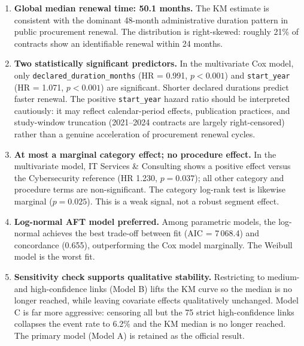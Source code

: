 \documentclass[12pt, a4paper]{article}
\begin{document}
\begin{enumerate}[leftmargin=*, label=\textbf{F\arabic*.}]

  \item \textbf{Global median renewal time: 50.1 months.} The KM estimate
        is consistent with the dominant 48-month administrative duration
        pattern in public procurement renewal. The distribution is right-skewed:
        roughly 21\% of contracts show an identifiable renewal within 24 months.

  \item \textbf{Two statistically significant predictors.} In the multivariate
        Cox model, only \texttt{declared\_duration\_months} (HR = 0.991,
        $p < 0.001$) and \texttt{start\_year} (HR = 1.071, $p < 0.001$) are
        significant. Shorter declared durations predict faster renewal.
        The positive \texttt{start\_year} hazard ratio should be interpreted
        cautiously: it may reflect calendar-period effects, publication
        practices, and study-window truncation (2021--2024 contracts are
        largely right-censored) rather than a genuine acceleration of
        procurement renewal cycles.

  \item \textbf{At most a marginal category effect; no procedure effect.}
        In the multivariate model, IT Services \& Consulting shows a positive
        effect versus the Cybersecurity reference (HR 1.230, $p = 0.037$);
        all other category and procedure terms are non-significant. The
        category log-rank test is likewise marginal ($p = 0.025$). This is a
        weak signal, not a robust segment effect.

  \item \textbf{Log-normal AFT model preferred.} Among parametric models, the
      log-normal achieves the best trade-off between fit (AIC = 7\,068.4) and
        concordance (0.655), outperforming the Cox model marginally. The Weibull
        model is the worst fit.

  \item \textbf{Sensitivity check supports qualitative stability.} Restricting to
        medium- and high-confidence links (Model B) lifts the KM curve so the
        median is no longer reached, while leaving covariate effects qualitatively
        unchanged. Model C is far more aggressive: censoring all but the 75
        strict high-confidence links collapses the event rate to 6.2\% and the
        KM median is no longer reached. The primary model (Model A) is retained
        as the official result.

\end{enumerate}
\end{document}
